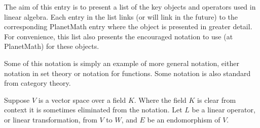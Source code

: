 \documentclass[12pt]{article}
\begin{document}
The aim of this entry is to present a list of the key
objects and operators used in linear algebra. Each entry in the
list links (or will link in the future) to the corresponding PlanetMath
entry where the object is presented in greater detail. For convenience, 
this list also presents the encouraged notation to use (at PlanetMath)
for these objects. 

Some of this notation is simply an example of more general notation, either notation in set theory or notation for functions.  Some notation is also standard from category theory.

Suppose $V$ is a vector space over a field $K$.  Where the field $K$ is clear from context it is sometimes eliminated from the notation.  Let $L$ be a linear operator, or linear transformation, from $V$ to $W$, and $E$ be an endomorphism of $V$.
\end{document}
